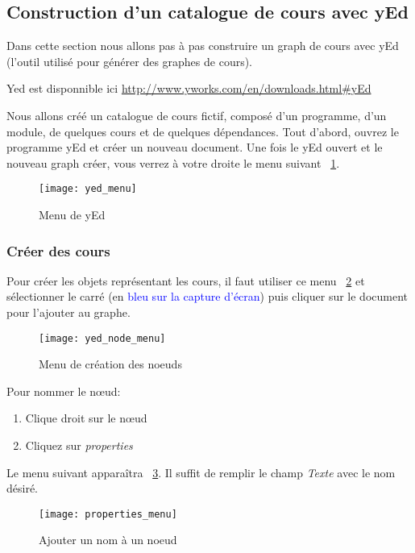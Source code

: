 \subsection{Construction d'un catalogue de cours avec yEd}
Dans cette section nous allons pas à pas construire un graph de cours avec yEd (l'outil utilisé pour générer des graphes de cours).

Yed est disponnible ici \url{http://www.yworks.com/en/downloads.html\#yEd}

Nous allons créé un  catalogue de cours fictif, composé d'un programme, d'un module, de quelques cours et de quelques dépendances. Tout d'abord, ouvrez le programme yEd et créer un nouveau document. Une fois le yEd ouvert et le nouveau graph créer, vous verrez à votre droite le menu suivant ~\ref{fig:yed_menu}.

\begin{figure}[htb]
\centering
\caption{Menu de yEd}
\label{fig:yed_menu}
\texttt{[image: yed\_menu]}
\end{figure}


\subsubsection{Créer des cours}
Pour créer les objets représentant les cours, il faut utiliser ce menu ~\ref{fig:yed_node_menu} et sélectionner le carré (en \textcolor{blue}{bleu sur la capture d'écran}) puis cliquer sur le document pour l'ajouter au graphe.

\begin{figure}[htb]
\centering
\caption{Menu de création des noeuds}
\label{fig:yed_node_menu}
\texttt{[image: yed\_node\_menu]}
\end{figure}

Pour nommer le nœud:
\begin{enumerate}
\item Clique droit sur le nœud
\item Cliquez sur \textit{properties}
\end{enumerate}

Le menu suivant apparaîtra ~\ref{fig:properties_menu}. Il suffit de remplir le champ \textit{Texte} avec le nom désiré.

\begin{figure}[htb]
\centering
\caption{Ajouter un nom à un noeud}
\label{fig:properties_menu}
\texttt{[image: properties\_menu]}
\end{figure}


